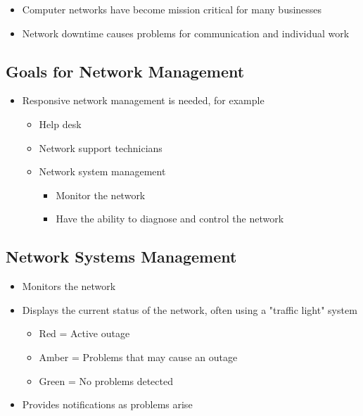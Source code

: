 
\begin{itemize}
  \item Computer networks have become mission critical for many businesses
  \item Network downtime causes problems for communication and individual work
\end{itemize}

\subsection*{Goals for Network Management}

\begin{itemize}
  \item Responsive network management is needed, for example
  \begin{itemize}
    \item Help desk
    \item Network support technicians
    \item Network system management
    \begin{itemize}
      \item Monitor the network
      \item Have the ability to diagnose and control the network
    \end{itemize}
  \end{itemize}
\end{itemize}

\subsection*{Network Systems Management}

\begin{itemize}
  \item Monitors the network
  \item Displays the current status of the network, often using a "traffic light" system
  \begin{itemize}
    \item Red = Active outage
    \item Amber = Problems that may cause an outage
    \item Green = No problems detected
  \end{itemize}
  \item Provides notifications as problems arise
\end{itemize}

